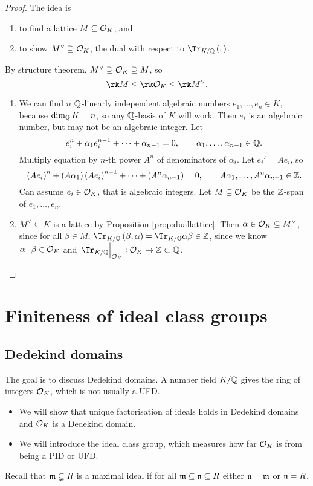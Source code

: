 \begin{proof}
The idea is
\begin{enumerate}
\item to find a lattice $ M \subseteq \mathcal{O}_K $, and
\item to show $ M^\vee \supseteq \mathcal{O}_K $, the dual with respect to $ \Tr_{K / \QQ}\br{,} $.
\end{enumerate}
By structure theorem, $ M^\vee \supseteq \mathcal{O}_K \supseteq M $, so
$$ \rk M \le \rk \OOO_K \le \rk M^\vee. $$
\begin{enumerate}
\item We can find $ n $ $ \mathbb{Q} $-linearly independent algebraic numbers $ e_1, \dots, e_n \in K $, because $ \dim_{\mathbb{Q}} K = n $, so any $ \mathbb{Q} $-basis of $ K $ will work. Then $ e_i $ is an algebraic number, but may not be an algebraic integer. Let
$$ e_i^n + \alpha_1e_i^{n - 1} + \dots + \alpha_{n - 1} = 0, \qquad \alpha_1, \dots, \alpha_{n - 1} \in \mathbb{Q}. $$
Multiply equation by $ n $-th power $ A^n $ of denominators of $ \alpha_i $. Let $ e_i' = Ae_i $, so
$$ \br{Ae_i}^n + \br{A\alpha_1}\br{Ae_i}^{n - 1} + \dots + \br{A^n\alpha_{n - 1}} = 0, \qquad A\alpha_1, \dots, A^n\alpha_{n - 1} \in \ZZ. $$
Can assume $ e_i \in \mathcal{O}_K $, that is algebraic integers. Let $ M \subseteq \mathcal{O}_K $ be the $ \mathbb{Z} $-span of $ e_1, \dots, e_n $.
\item $ M^\vee \subseteq K $ is a lattice by Proposition \ref{prop:duallattice}. Then $ \alpha \in \mathcal{O}_K \subseteq M^\vee $, since for all $ \beta \in M $, $ \Tr_{K / \QQ}\br{\beta, \alpha} = \Tr_{K / \QQ} \alpha\beta \in \ZZ $, since we know $ \alpha \cdot \beta \in \mathcal{O}_K $ and $ \eval{\Tr_{K / \QQ}}_{\OOO_K} : \OOO_K \to \ZZ \subset \QQ $.
\end{enumerate}
\end{proof}

\pagebreak

\section{Finiteness of ideal class groups}

\subsection{Dedekind domains}


The goal is to discuss Dedekind domains. A number field $ K / \mathbb{Q} $ gives the ring of integers $ \mathcal{O}_K $, which is not usually a UFD.
\begin{itemize}
\item We will show that unique factorisation of ideals holds in Dedekind domains and $ \mathcal{O}_K $ is a Dedekind domain.
\item We will introduce the ideal class group, which measures how far $ \mathcal{O}_K $ is from being a PID or UFD.
\end{itemize}
Recall that $ \mathfrak{m} \subsetneq R $ is a maximal ideal if for all $ \mathfrak{m} \subseteq \mathfrak{n} \subseteq R $ either $ \mathfrak{n} = \mathfrak{m} $ or $ \mathfrak{n} = R $.

